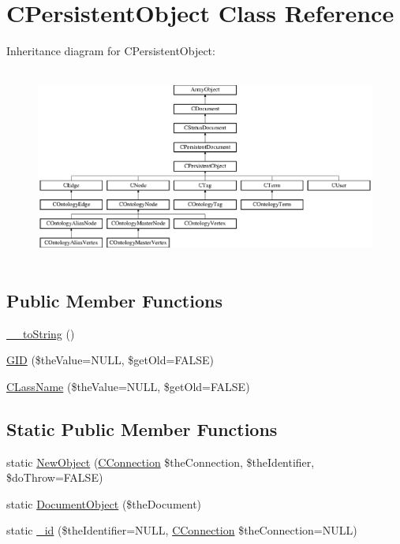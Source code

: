 \hypertarget{class_c_persistent_object}{\section{C\-Persistent\-Object Class Reference}
\label{class_c_persistent_object}
}
Inheritance diagram for C\-Persistent\-Object\-:\begin{figure}[H]
\begin{center}
\leavevmode
\includegraphics[height=6.461539cm]{class_c_persistent_object}
\end{center}
\end{figure}
\subsection*{Public Member Functions}
\begin{DoxyCompactItemize}
\item 
\hyperlink{class_c_persistent_object_a63f0a77d9664202a629f75be0a896659}{\-\_\-\-\_\-to\-String} ()
\item 
\hyperlink{class_c_persistent_object_abc705190184236693b30c15d7bc30b82}{G\-I\-D} (\$the\-Value=N\-U\-L\-L, \$get\-Old=F\-A\-L\-S\-E)
\item 
\hyperlink{class_c_persistent_object_a8ddd4477818aaff75a509b265dda77f1}{C\-Lass\-Name} (\$the\-Value=N\-U\-L\-L, \$get\-Old=F\-A\-L\-S\-E)
\end{DoxyCompactItemize}
\subsection*{Static Public Member Functions}
\begin{DoxyCompactItemize}
\item 
static \hyperlink{class_c_persistent_object_a5a5402ef394104148cfc580a6799ac2b}{New\-Object} (\hyperlink{class_c_connection}{C\-Connection} \$the\-Connection, \$the\-Identifier, \$do\-Throw=F\-A\-L\-S\-E)
\item 
static \hyperlink{class_c_persistent_object_a714b50e717e343bbc2e48861a30d624b}{Document\-Object} (\$the\-Document)
\item 
static \hyperlink{class_c_persistent_object_ace9f531fd290f67d5ef0398b5233d558}{\-\_\-id} (\$the\-Identifier=N\-U\-L\-L, \hyperlink{class_c_connection}{C\-Connection} \$the\-Connection=N\-U\-L\-L)
\end{DoxyCompactItemize}
